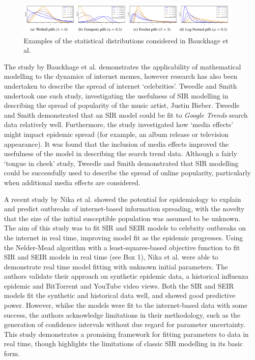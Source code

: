 \begin{figure}[ht!]
\centering
\includegraphics[width=160mm]{statsdist.png}
\caption{Examples of the statistical distributions considered in Bauckhage et al.\cite{meme}}
\label{sir}
\end{figure}

The study by Bauckhage et al. demonstrates the applicability of mathematical modelling to the dynamics of internet memes, however research has also been undertaken to describe the spread of internet `celebrities'. Tweedle and Smith undertook one such study, investigating the usefulness of SIR modelling in describing the spread of popularity of the music artist, Justin Bieber.\cite{bieber} Tweedle and Smith demonstrated that an SIR model could be fit to \emph{Google Trends} search data relatively well. Furthermore, the study investigated how `media effects' might impact epidemic spread (for example, an album release or television appearance). It was found that the inclusion of media effects improved the usefulness of the model in describing the search trend data. Although a fairly `tongue in cheek' study, Tweedle and Smith demonstrated that SIR modelling could be successfully used to describe the spread of online popularity, particularly when additional media effects are considered.

A recent study by Nika et al. showed the potential for epidemiology to explain and predict outbreaks of internet-based information spreading, with the novelty that the size of the initial susceptible population was assumed to be unknown.\cite{marily2013} The aim of this study was to fit SIR and SEIR models to celebrity outbreaks on the internet in real time, improving model fit as the epidemic progresses. Using the Nelder-Mead algorithm with a least-squares-based objective function to fit SIR and SEIR models in real time (see Box 1), Nika et al. were able to demonstrate real time model fitting with unknown initial parameters. The authors validate their approach on synthetic epidemic data, a historical influenza epidemic and BitTorrent and YouTube video views. Both the SIR and SEIR models fit the synthetic and historical data well, and showed good predictive power. However, whilse the models were fit to the internet-based data with some success, the authors acknowledge limitations in their methodology, such as the generation of confidence intervals without due regard for parameter uncertainty. This study demonstrates a promising framework for fitting parameters to data in real time, though highlights the limitations of classic SIR modelling in its basic form.

